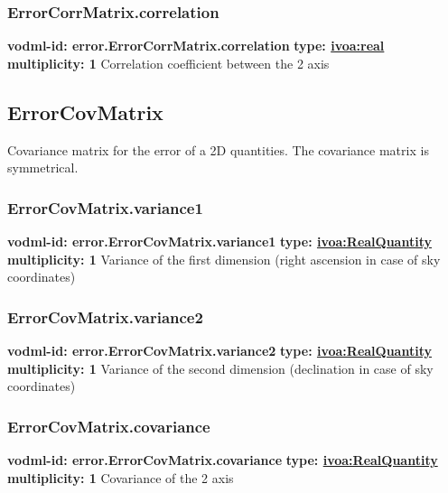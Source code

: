     \subsubsection{ErrorCorrMatrix.correlation}
      \textbf{vodml-id: error.ErrorCorrMatrix.correlation} \newline
      \textbf{type: \hyperref[sect:ivoa]{ivoa:real}} \newline
      \textbf{multiplicity: 1} \newline
      Correlation coefficient between the 2 axis

  \subsection{ErrorCovMatrix}
  \label{sect:error.ErrorCovMatrix}
    Covariance matrix for the error of a 2D quantities. The covariance matrix is symmetrical.

    \subsubsection{ErrorCovMatrix.variance1}
      \textbf{vodml-id: error.ErrorCovMatrix.variance1} \newline
      \textbf{type: \hyperref[sect:ivoa]{ivoa:RealQuantity}} \newline
      \textbf{multiplicity: 1} \newline
      Variance of the first dimension (right ascension in case of sky coordinates)

    \subsubsection{ErrorCovMatrix.variance2}
      \textbf{vodml-id: error.ErrorCovMatrix.variance2} \newline
      \textbf{type: \hyperref[sect:ivoa]{ivoa:RealQuantity}} \newline
      \textbf{multiplicity: 1} \newline
      Variance of the second dimension (declination in case of sky coordinates)

    \subsubsection{ErrorCovMatrix.covariance}
      \textbf{vodml-id: error.ErrorCovMatrix.covariance} \newline
      \textbf{type: \hyperref[sect:ivoa]{ivoa:RealQuantity}} \newline
      \textbf{multiplicity: 1} \newline
      Covariance of the 2 axis

